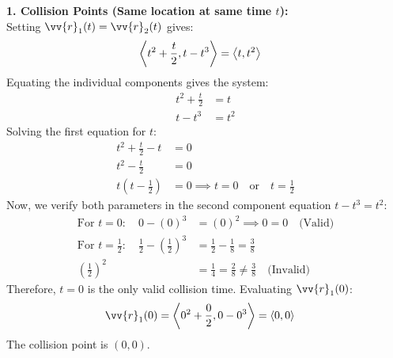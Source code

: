 \begin{sol}
\textbf{1. Collision Points (Same location at same time $t$):} \\
Setting $\vv{r}_1(t) = \vv{r}_2(t)$ gives:
\begin{align*}
\left\langle t^2 + \dfrac{t}{2}, t - t^3 \right\rangle &= \left\langle t, t^2 \right\rangle
\end{align*}
Equating the individual components gives the system:
\begin{align*}
t^2 + \frac{t}{2} &= t \\
t - t^3 &= t^2
\end{align*}
Solving the first equation for $t$:
\begin{align*}
t^2 + \frac{t}{2} - t &= 0 \\
t^2 - \frac{t}{2} &= 0 \\
t\left(t - \frac{1}{2}\right) &= 0 \implies t = 0 \quad \text{or} \quad t = \frac{1}{2}
\end{align*}
Now, we verify both parameters in the second component equation $t - t^3 = t^2$:
\begin{align*}
\text{For } t = 0: \quad 0 - (0)^3 &= (0)^2 \implies 0 = 0 \quad \text{(Valid)} \\
\text{For } t = \frac{1}{2}: \quad \frac{1}{2} - \left(\frac{1}{2}\right)^3 &= \frac{1}{2} - \frac{1}{8} = \frac{3}{8} \\
\left(\frac{1}{2}\right)^2 &= \frac{1}{4} = \frac{2}{8} \neq \frac{3}{8} \quad \text{(Invalid)}
\end{align*}
Therefore, $t = 0$ is the only valid collision time. Evaluating $\vv{r}_1(0)$:
\begin{align*}
\vv{r}_1(0) &= \ang{0^2 + \frac{0}{2}, 0 - 0^3} = \ang{0, 0}
\end{align*}
The collision point is $(0, 0)$.


\end{sol}
